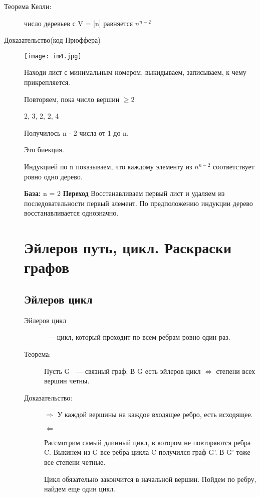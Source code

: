 \documentclass[12pt]{article}
\begin{document}
\begin{description}
\item[Теорема Келли:] число деревьев с V = [n] равняется $n^{n - 2}$
\item[Доказательство(код Прюффера)]

\begin{center} 
\texttt{[image: im4.jpg]} 
\end{center}

Находи лист с минимальным номером, выкидываем, записываем, к чему прикрепляется. 

Повторяем, пока число вершин $\ge 2$

2, 3, 2, 2, 4

Получилось n - 2 числа от 1 до n.

Это биекция.

Индукцией по n показываем, что каждому элементу из $n^{n - 2}$ соответствует ровно одно дерево. 

{\bf База:} n = 2
{\bf Переход} Восстанавливаем первый лист и удаляем из последовательности первый элемент. По предположению индукции дерево восстанавливается однозначно.

\section{Эйлеров путь, цикл. Раскраски графов}
\subsection{Эйлеров цикл}

\begin{description}
\item[Эйлеров цикл] ~--- цикл, который проходит по всем ребрам ровно один раз. 

\item[Теорема:] Пусть G ~--- связный граф. В G есть эйлеров цикл $\Leftrightarrow$ степени всех вершин четны. 

\item[Доказательство:] $\Rightarrow$ У каждой вершины на каждое входящее ребро, есть исходящее. 

$\Leftarrow$ 

Рассмотрим самый длинный цикл, в котором не повторяются ребра C. Выкинем из G все ребра цикла C получился граф G'. В G' тоже все степени четные. 

Цикл обязательно закончится в начальной вершин. Пойдем по ребру, найдем еще один цикл. 


\end{description}
\end{description}
\end{document}
